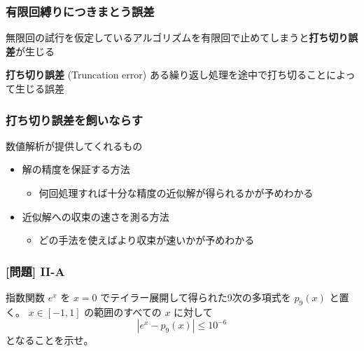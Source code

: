 \documentclass[dvipdfmx,aspectratio=169,20pt]{beamer}
\begin{document}
\date[\todey]{}

\frame{\titlepage}

\begin{frame}
\frametitle{有限回縛りにつきまとう誤差}
無限回の試行を仮定しているアルゴリズムを有限回で止めてしまうと{\bf 打ち切り誤差}が生じる
\vspace{0.5cm}
\begin{block}{{\bf 打ち切り誤差} {\small (Truncation error)}}
    ある繰り返し処理を途中で打ち切ることによって生じる誤差
\end{block}
\end{frame}
\begin{frame}
\frametitle{打ち切り誤差を飼いならす}
数値解析が提供してくれるもの
\vspace{0.25cm}

\begin{itemize}
    \setlength{\itemsep}{0.25cm}
    \item 解の精度を保証する方法
    \begin{itemize}
        \item  何回処理すれば十分な精度の近似解が得られるかが予めわかる
    \end{itemize}
    \item 近似解への収束の速さを測る方法
    \begin{itemize}
        \item どの手法を使えばより収束が速いかが予めわかる
    \end{itemize}
\end{itemize}
\end{frame}
\begin{frame}
\frametitle{[問題] I\hspace{-.01em}I-A}

指数関数 $e^x$ を    $x=0$ でテイラー展開して得られた9次の多項式を $p_9(x)$ と置く。
$x\in [-1,1]$ の範囲のすべての $x$ に対して
\begin{equation*}
    |e^x - p_9(x)|\le 10^{-6}
\end{equation*}
となることを示せ。
\end{frame}
\end{document}
